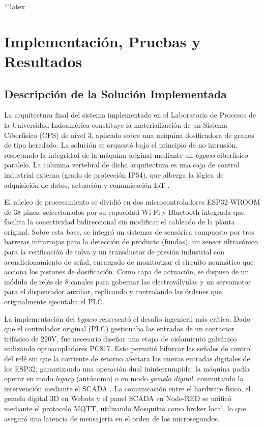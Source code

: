```latex
\chapter{Implementación, Pruebas y Resultados}
\label{chap:implementacion}

\section{Descripción de la Solución Implementada}

La arquitectura final del sistema implementado en el Laboratorio de Procesos de la Universidad Indoamérica constituye la materialización de un Sistema Ciberfísico (CPS) de nivel 3, aplicado sobre una máquina dosificadora de granos de tipo heredado. La solución se orquestó bajo el principio de no intrusión, respetando la integridad de la máquina original mediante un \textit{bypass} ciberfísico paralelo. La columna vertebral de dicha arquitectura es una caja de control industrial externa (grado de protección IP54), que alberga la lógica de adquisición de datos, actuación y comunicación IoT \cite{Kritzinger2018DigitalTwin}.

El núcleo de procesamiento se dividió en dos microcontroladores ESP32-WROOM de 38 pines, seleccionados por su capacidad Wi-Fi y Bluetooth integrada que facilita la conectividad bidireccional sin modificar el cableado de la planta original. Sobre esta base, se integró un sistemas de sensórica compuesto por tres barreras infrarrojas para la detección de producto (fundas), un sensor ultrasónico para la verificación de tolva y un transductor de presión industrial con acondicionamiento de señal, encargado de monitorizar el circuito neumático que acciona los pistones de dosificación. Como capa de actuación, se dispuso de un módulo de relés de 8 canales para gobernar las electroválvulas y un servomotor para el dispensador auxiliar, replicando y controlando las órdenes que originalmente ejecutaba el PLC.

La implementación del \textit{bypass} representó el desafío ingenieril más crítico. Dado que el controlador original (PLC) gestionaba las entradas de un contactor trifásico de 220V, fue necesario diseñar una etapa de aislamiento galvánico utilizando optoacopladores PC817. Esto permitió bifurcar las señales de control del relé sin que la corriente de retorno afectara las nuevas entradas digitales de los ESP32, garantizando una operación dual ininterrumpida: la máquina podía operar en modo \textit{legacy} (autónomo) o en modo \textit{gemelo digital}, conmutando la intervención mediante el SCADA \cite{Monostori2016CPS}. La comunicación entre el hardware físico, el gemelo digital 3D en Webots y el panel SCADA en Node-RED se unificó mediante el protocolo MQTT, utilizando Mosquitto como broker local, lo que aseguró una latencia de mensajería en el orden de los microsegundos.

